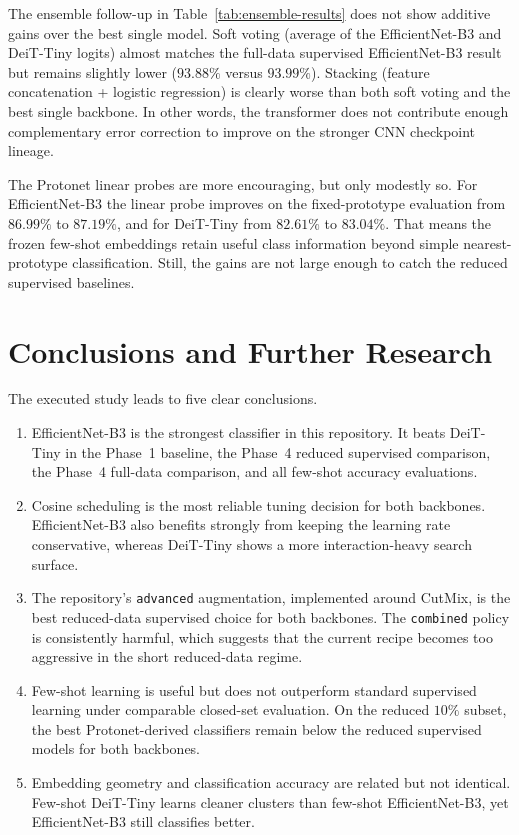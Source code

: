 \documentclass[12pt,a4paper]{article}
\begin{document}
The ensemble follow-up in Table~\ref{tab:ensemble-results} does not show additive gains over the best single model. Soft voting (average of the EfficientNet-B3 and DeiT-Tiny logits) almost matches the full-data supervised EfficientNet-B3 result but remains slightly lower ($93.88\%$ versus $93.99\%$). Stacking (feature concatenation + logistic regression) is clearly worse than both soft voting and the best single backbone. In other words, the transformer does not contribute enough complementary error correction to improve on the stronger CNN checkpoint lineage.

The Protonet linear probes are more encouraging, but only modestly so. For EfficientNet-B3 the linear probe improves on the fixed-prototype evaluation from $86.99\%$ to $87.19\%$, and for DeiT-Tiny from $82.61\%$ to $83.04\%$. That means the frozen few-shot embeddings retain useful class information beyond simple nearest-prototype classification. Still, the gains are not large enough to catch the reduced supervised baselines.

\section{Conclusions and Further Research}
\label{sec:conclusions}

The executed study leads to five clear conclusions.

\begin{enumerate}[nosep]
    \item EfficientNet-B3 is the strongest classifier in this repository. It beats DeiT-Tiny in the Phase~1 baseline, the Phase~4 reduced supervised comparison, the Phase~4 full-data comparison, and all few-shot accuracy evaluations.
    \item Cosine scheduling is the most reliable tuning decision for both backbones. EfficientNet-B3 also benefits strongly from keeping the learning rate conservative, whereas DeiT-Tiny shows a more interaction-heavy search surface.
    \item The repository's \texttt{advanced} augmentation, implemented around CutMix, is the best reduced-data supervised choice for both backbones. The \texttt{combined} policy is consistently harmful, which suggests that the current recipe becomes too aggressive in the short reduced-data regime.
    \item Few-shot learning is useful but does not outperform standard supervised learning under comparable closed-set evaluation. On the reduced $10\%$ subset, the best Protonet-derived classifiers remain below the reduced supervised models for both backbones.
    \item Embedding geometry and classification accuracy are related but not identical. Few-shot DeiT-Tiny learns cleaner clusters than few-shot EfficientNet-B3, yet EfficientNet-B3 still classifies better.
\end{enumerate}
\end{document}
